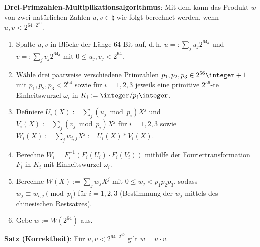 \textbf{Drei-Primzahlen-Multiplikationsalgorithmus}:
Mit dem  kann das Produkt $w$ von zwei
natürlichen Zahlen $u, v \in \natural$ wie folgt berechnet werden,
wenn $u, v < 2^{64 \cdot 2^{40}}$.
\begin{enumerate}
    \item
    Spalte $u, v$ in Blöcke der Länge 64 Bit auf, d.\,h.
    $u =: \sum_j u_j 2^{64j}$ und $v =: \sum_j v_j 2^{64j}$ mit
    $0 \le u_j, v_j < 2^{64}$.

    \item
    Wähle drei paarweise verschiedene Primzahlen $p_1, p_2, p_3 \in 2^{56}\integer + 1$
    mit $p_1, p_2, p_3 < 2^{64}$
    sowie für $i = 1, 2, 3$ jeweils
    eine primitive $2^{56}$-te Einheitswurzel $\omega_i$ in $K_i := \integer/p_i\integer$.

    \item
    Definiere $U_i(X) := \sum_j (u_j \bmod p_i) X^j$ und
    $V_i(X) := \sum_j (v_j \bmod p_i) X^j$ für $i = 1, 2, 3$
    sowie $W_i(X) := \sum_j w_{i,j} X^j := U_i(X) \ast V_i(X)$.

    \item
    Berechne $W_i = F_i^{-1}(F_i(U_i) \cdot F_i(V_i))$ mithilfe der
    Fouriertransformation $F_i$ in $K_i$ mit Einheitswurzel $\omega_i$.

    \item
    Berechne $W(X) := \sum_j w_j X^j$ mit $0 \le w_j < p_1 p_2 p_3$, sodass
    $w_j \equiv w_{i,j} \pmod{p_i}$ für $i = 1, 2, 3$
    (Bestimmung der $w_j$ mittels des chinesischen Restsatzes).

    \item
    Gebe $w := W(2^{64})$ aus.
\end{enumerate}

\linie

\textbf{Satz (Korrektheit)}:
Für $u, v < 2^{64 \cdot 2^{40}}$ gilt $w = u \cdot v$.

